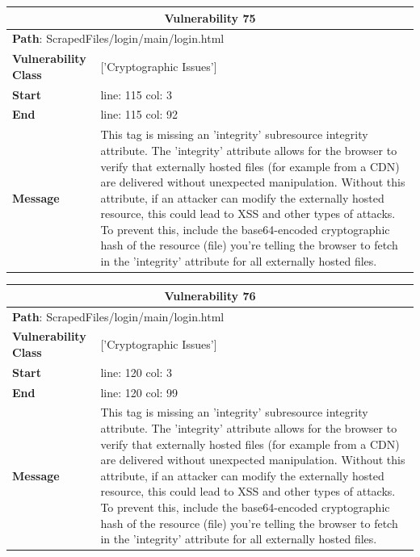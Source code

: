 \documentclass[12pt]{article}
\begin{document}
\begin{table}[!h]
\centering
\renewcommand{\arraystretch}{1.3}
\begin{tabular}{|l|p{10cm}|}
\hline
\multicolumn{2}{|c|}{\textbf{Vulnerability 75}} \\
\hline
\multicolumn{2}{|l|}{\textbf{Path}: ScrapedFiles/login/main/login.html} \\
\hline
\textbf{Vulnerability Class} & ['Cryptographic Issues'] \\
\hline
\textbf{Start} & line: 115 \quad col: 3 \\
\hline
\textbf{End} & line: 115 \quad col: 92 \\
\hline
\textbf{Message} & This tag is missing an 'integrity' subresource integrity attribute. The 'integrity' attribute allows for the browser to verify that externally hosted files (for example from a CDN) are delivered without unexpected manipulation. Without this attribute, if an attacker can modify the externally hosted resource, this could lead to XSS and other types of attacks. To prevent this, include the base64-encoded cryptographic hash of the resource (file) you're telling the browser to fetch in the 'integrity' attribute for all externally hosted files. \\
\hline
\end{tabular}
\end{table}
\vspace{0.7cm}
\FloatBarrier
\begin{table}[!h]
\centering
\renewcommand{\arraystretch}{1.3}
\begin{tabular}{|l|p{10cm}|}
\hline
\multicolumn{2}{|c|}{\textbf{Vulnerability 76}} \\
\hline
\multicolumn{2}{|l|}{\textbf{Path}: ScrapedFiles/login/main/login.html} \\
\hline
\textbf{Vulnerability Class} & ['Cryptographic Issues'] \\
\hline
\textbf{Start} & line: 120 \quad col: 3 \\
\hline
\textbf{End} & line: 120 \quad col: 99 \\
\hline
\textbf{Message} & This tag is missing an 'integrity' subresource integrity attribute. The 'integrity' attribute allows for the browser to verify that externally hosted files (for example from a CDN) are delivered without unexpected manipulation. Without this attribute, if an attacker can modify the externally hosted resource, this could lead to XSS and other types of attacks. To prevent this, include the base64-encoded cryptographic hash of the resource (file) you're telling the browser to fetch in the 'integrity' attribute for all externally hosted files. \\
\hline
\end{tabular}
\end{table}
\end{document}
